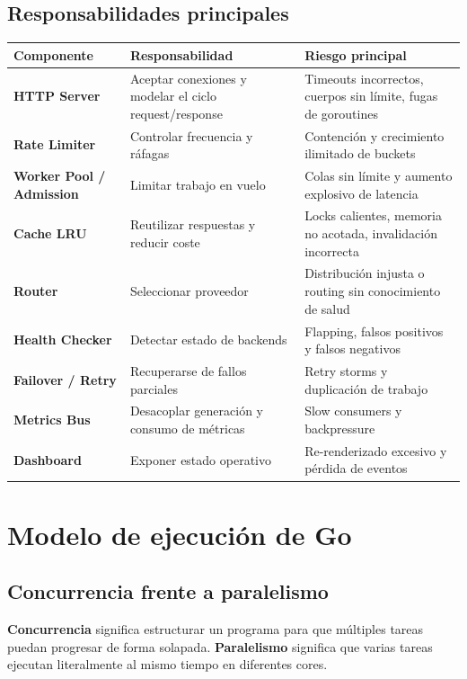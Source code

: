 \documentclass[11pt,a4paper]{article}
\begin{document}
\subsection{Responsabilidades principales}

\begin{table}[h]
\centering
\small
\begin{tabularx}{\textwidth}{>{\bfseries}p{3.2cm} X X}
\toprule
Componente & Responsabilidad & Riesgo principal \\
\midrule
HTTP Server & Aceptar conexiones y modelar el ciclo request/response & Timeouts incorrectos, cuerpos sin límite, fugas de goroutines \\
Rate Limiter & Controlar frecuencia y ráfagas & Contención y crecimiento ilimitado de buckets \\
Worker Pool / Admission & Limitar trabajo en vuelo & Colas sin límite y aumento explosivo de latencia \\
Cache LRU & Reutilizar respuestas y reducir coste & Locks calientes, memoria no acotada, invalidación incorrecta \\
Router & Seleccionar proveedor & Distribución injusta o routing sin conocimiento de salud \\
Health Checker & Detectar estado de backends & Flapping, falsos positivos y falsos negativos \\
Failover / Retry & Recuperarse de fallos parciales & Retry storms y duplicación de trabajo \\
Metrics Bus & Desacoplar generación y consumo de métricas & Slow consumers y backpressure \\
Dashboard & Exponer estado operativo & Re-renderizado excesivo y pérdida de eventos \\
\bottomrule
\end{tabularx}
\end{table}

\section{Modelo de ejecución de Go}

\subsection{Concurrencia frente a paralelismo}

\textbf{Concurrencia} significa estructurar un programa para que múltiples tareas puedan progresar de forma solapada. \textbf{Paralelismo} significa que varias tareas ejecutan literalmente al mismo tiempo en diferentes cores.
\end{document}
